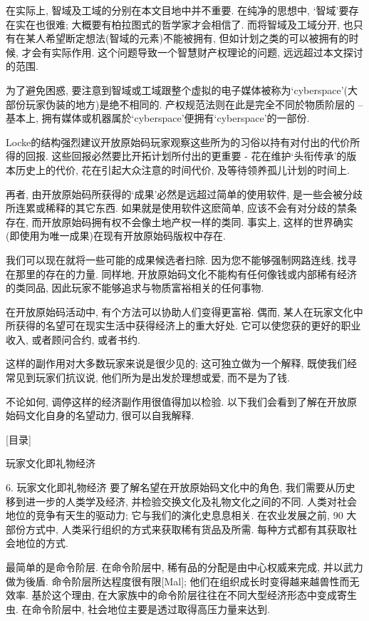 \documentclass[a4paper,12pt,UTF8,twoside]{ctexbook}
\begin{document}
在实际上, 智域及工域的分别在本文目地中并不重要. 在纯净的思想中, `智域'要存在实在也很难; 大概要有柏拉图式的哲学家才会相信了. 而将智域及工域分开, 也只有在某人希望断定想法(智域的元素)不能被拥有, 但如计划之类的可以被拥有的时候, 才会有实际作用. 这个问题导致一个智慧财产权理论的问题, 远远超过本文探讨的范围.

为了避免困惑, 要注意到智域或工域跟整个虚拟的电子媒体被称为`cyberspace'(大部份玩家伪装的地方)是绝不相同的. 产权规范法则在此是完全不同於物质阶层的 -- 基本上, 拥有媒体或机器属於`cyberspace'便拥有`cyberspace'的一部份.

Locke的结构强烈建议开放原始码玩家观察这些所为的习俗以持有对付出的代价所得的回报.  这些回报必然要比开拓计划所付出的更重要 - 花在维护`头衔传承'的版本历史上的代价, 花在引起大众注意的时间代价, 及等待领养孤儿计划的时间上.

再者, 由开放原始码所获得的`成果'必然是远超过简单的使用软件, 是一些会被分歧所连累或稀释的其它东西. 如果就是使用软件这麽简单, 应该不会有对分歧的禁条存在, 而开放原始码拥有权不会像土地产权一样的类同. 事实上, 这样的世界确实(即使用为唯一成果)在现有开放原始码版权中存在.

我们可以现在就将一些可能的成果候选者扫除. 因为您不能够强制网路连线, 找寻在那里的存在的力量. 同样地, 开放原始码文化不能构有任何像钱或内部稀有经济的类同品, 因此玩家不能够追求与物质富裕相关的任何事物.

在开放原始码活动中, 有个方法可以协助人们变得更富裕. 偶而, 某人在玩家文化中所获得的名望可在现实生活中获得经济上的重大好处. 它可以使您获的更好的职业收入, 或者顾问合约, 或者书约.

这样的副作用对大多数玩家来说是很少见的; 这可独立做为一个解释, 既使我们经常见到玩家们抗议说, 他们所为是出发於理想或爱, 而不是为了钱.

不论如何, 调停这样的经济副作用很值得加以检验. 以下我们会看到了解在开放原始码文化自身的名望动力, 很可以自我解释.

[目录]

玩家文化即礼物经济

6. 玩家文化即礼物经济
要了解名望在开放原始码文化中的角色, 我们需要从历史移到进一步的人类学及经济, 并检验交换文化及礼物文化之间的不同.
人类对社会地位的竞争有天生的驱动力; 它与我们的演化史息息相关. 在农业发展之前, 90%
大部份方式中, 人类采行组织的方式来获取稀有货品及所需. 每种方式都有其获取社会地位的方式.

最简单的是命令阶层. 在命令阶层中, 稀有品的分配是由中心权威来完成, 并以武力做为後盾.  命令阶层所达程度很有限[Mal]; 他们在组织成长时变得越来越兽性而无效率. 基於这个理由, 在大家族中的命令阶层往往在不同大型经济形态中变成寄生虫.  在命令阶层中, 社会地位主要是透过取得高压力量来达到.
\end{document}
